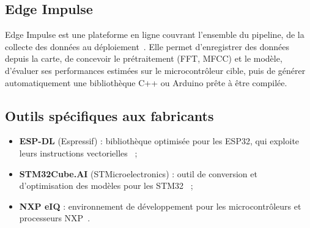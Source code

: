 \subsection{Edge Impulse}

Edge Impulse est une plateforme en ligne couvrant l'ensemble du pipeline, de la
collecte des données au déploiement~\cite{edgeimpulse}. Elle permet
d'enregistrer des données depuis la carte, de concevoir le prétraitement
(FFT, MFCC) et le modèle, d'évaluer ses performances estimées sur le
microcontrôleur cible, puis de générer automatiquement une bibliothèque C++ ou
Arduino prête à être compilée.

\subsection{Outils spécifiques aux fabricants}
\begin{itemize}
  \item \textbf{ESP-DL} (Espressif) : bibliothèque optimisée pour les ESP32, qui
        exploite leurs instructions vectorielles~\cite{espressif-espdl} ;
  \item \textbf{STM32Cube.AI} (STMicroelectronics) : outil de conversion et
        d'optimisation des modèles pour les STM32~\cite{st-cubeai} ;
  \item \textbf{NXP eIQ} : environnement de développement pour les
        microcontrôleurs et processeurs NXP~\cite{nxp-eiq}.
\end{itemize}
